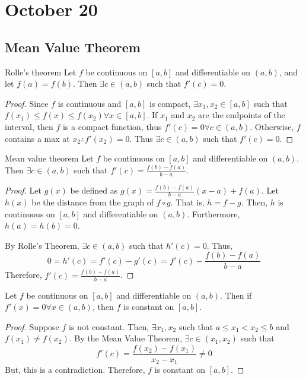 \chapter{October 20}

\section{Mean Value Theorem}
\begin{theorem}{Rolle's theorem}{}
    Let $f$ be continuous on $[a,b]$ and differentiable on $(a,b)$, and let $f(a) = f(b)$. Then $\exists c \in (a,b)$ such that $f'(c) = 0$.
\end{theorem}
\begin{proof}
    Since $f$ is continuous and $[a, b]$ is compact, $\exists x_1, x_2 \in [a, b]$ such that $f(x_1) \leq f(x) \leq f(x_2) \forall x \in [a, b]$. If $x_1$ and $x_2$ are the endpoints of the interval, then $f$ is a compact function, thus $f'(c) = 0 \forall c \in (a, b)$. Otherwise, $f$ contains a max at $x_2 \therefore f'(x_2) = 0$. Thus $\exists c \in (a, b)$ such that $f'(c) = 0$.
\end{proof}

\begin{theorem}{Mean value theorem}{}
    Let $f$ be continuous on $[a,b]$ and differentiable on $(a,b)$. Then $\exists c \in (a,b)$ such that $f'(c) = \frac{f(b) - f(a)}{b - a}$.
\end{theorem}
\begin{proof}
    Let $g(x)$ be defined as $g(x) = \frac{f(b) - f(a)}{b - a} (x - a) + f(a)$. Let $h(x)$ be the distance from the graph of $f \circ g$. That is, $h = f - g$. Then, $h$ is continuous on $[a, b]$ and differentiable on $(a, b)$. Furthermore, $h(a) = h(b) = 0$.
    
    By Rolle's Theorem, $\exists c \in (a, b)$ such that $h'(c) = 0$. Thus, $$0 = h'(c) = f'(c) - g'(c) = f'(c) - \frac{f(b) - f(a)}{b - a}$$ Therefore, $f'(c) = \frac{f(b) - f(a)}{b - a}$.
\end{proof}

\begin{theorem}{}{}
    Let $f$ be continuous on $[a,b]$ and differentiable on $(a,b)$. Then if $f'(x) = 0 \forall x \in (a, b)$, then $f$ is constant on $[a, b]$.
\end{theorem}
\begin{proof}
    Suppose $f$ is not constant. Then, $\exists x_1, x_2$ such that $a \leq x_1 < x_2 \leq b$ and $f(x_1) \neq f(x_2)$. By the Mean Value Theorem, $\exists c \in (x_1, x_2)$ such that $$f'(c) = \frac{f(x_2) - f(x_1)}{x_2 - x_1} \neq 0$$ But, this is a contradiction. Therefore, $f$ is constant on $[a, b]$.
\end{proof}

